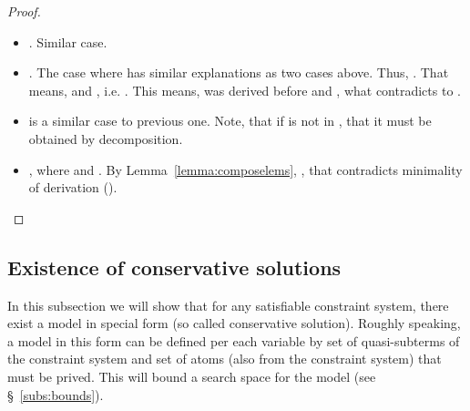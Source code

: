 \begin{prop}
\begin{proof}
\begin{itemize}
		\item  . Similar case.
		
		\item . The case where  has similar explanations as two cases above. Thus, . That means,  and 
		 , i.e. . 
This means,  was derived before and , what contradicts to  .
		
\item  is a similar case to previous one. Note, that if  is not in , that it must be obtained by decomposition.
		
		\item , where  and . By Lemma~\ref{lemma:composelems}, , that contradicts minimality of derivation ().
	\end{itemize}

	
\end{proof}
\end{prop}



\subsection{Existence of conservative solutions}

In this subsection we will show that for any satisfiable constraint system, there exist a model in special form (so called conservative solution). 
Roughly speaking, a model in this form can be defined per each variable by set of quasi-subterms of the constraint system and set of atoms (also from the constraint system) that must be prived.
This will bound a search space for the model (see \S~\ref{subs:bounds}).

